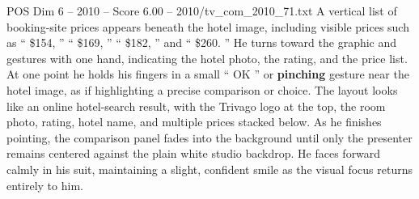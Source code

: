 \begin{textsample}{POS Dim 6 – 2010 – Score 6.00 – 2010/tv\_com\_2010\_71.txt}
A vertical list of booking-site prices appears beneath the hotel image, including visible prices such as “ \$154, ” “ \$169, ” “ \$182, ” and “ \$260. ” He turns toward the graphic and gestures with one hand, indicating the hotel photo, the rating, and the price list.
At one point he holds his fingers in a small “ OK ” or \textbf{pinching} gesture near the hotel image, as if highlighting a precise comparison or choice.
The layout looks like an online hotel-search result, with the Trivago logo at the top, the room photo, rating, hotel name, and multiple prices stacked below.
As he finishes pointing, the comparison panel fades into the background until only the presenter remains centered against the plain white studio backdrop.
He faces forward calmly in his suit, maintaining a slight, confident smile as the visual focus returns entirely to him.

\end{textsample}
